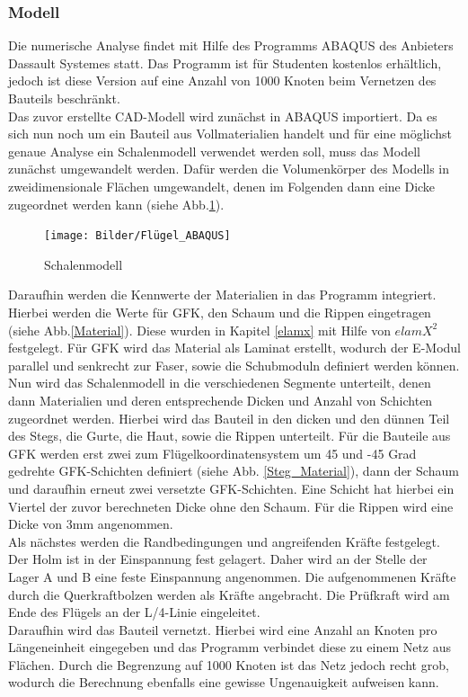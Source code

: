
\subsubsection{Modell}
Die numerische Analyse findet mit Hilfe des Programms ABAQUS des Anbieters Dassault Systemes statt. Das Programm ist für Studenten kostenlos erhältlich, jedoch ist diese Version auf eine Anzahl von 1000 Knoten beim Vernetzen des Bauteils beschränkt.\\
Das zuvor erstellte CAD-Modell wird zunächst in ABAQUS importiert. Da es sich nun noch um ein Bauteil aus Vollmaterialien handelt und für eine möglichst genaue Analyse ein Schalenmodell verwendet werden soll, muss das Modell zunächst umgewandelt werden. Dafür werden die Volumenkörper des Modells in zweidimensionale Flächen umgewandelt, denen im Folgenden dann eine Dicke zugeordnet werden kann (siehe Abb.\ref{Schalenmodell}).

\begin{figure}[h]
 \centering
 \texttt{[image: Bilder/Flügel\_ABAQUS]}
 \caption{Schalenmodell}
 \label{Schalenmodell}
\end{figure}
\noindent Daraufhin werden die Kennwerte der Materialien in das Programm integriert. Hierbei werden die Werte für GFK, den Schaum und die Rippen eingetragen (siehe Abb.\ref{Material}). Diese wurden in Kapitel \ref{elamx} mit Hilfe von $elamX^{2}$ festgelegt. Für GFK wird das Material als Laminat erstellt, wodurch der E-Modul parallel und senkrecht zur Faser, sowie die Schubmoduln definiert werden können.\\
\noindent Nun wird das Schalenmodell in die verschiedenen Segmente unterteilt, denen dann Materialien und deren entsprechende Dicken und Anzahl von Schichten zugeordnet werden. Hierbei wird das Bauteil in den dicken und den dünnen Teil des Stegs, die Gurte, die Haut, sowie die Rippen unterteilt. Für die Bauteile aus GFK werden erst zwei zum Flügelkoordinatensystem um 45 und -45 Grad gedrehte GFK-Schichten definiert (siehe Abb. \ref{Steg_Material}), dann der Schaum und daraufhin erneut zwei versetzte GFK-Schichten. Eine Schicht hat hierbei ein Viertel der zuvor berechneten Dicke ohne den Schaum. Für die Rippen wird eine Dicke von 3mm angenommen.\\
\noindent Als nächstes werden die Randbedingungen und angreifenden Kräfte festgelegt. Der Holm ist in der Einspannung fest gelagert. Daher wird an der Stelle der Lager A und B eine feste Einspannung angenommen. Die aufgenommenen Kräfte durch die Querkraftbolzen werden als Kräfte angebracht. Die Prüfkraft wird am Ende des Flügels an der L/4-Linie eingeleitet.\\
Daraufhin wird das Bauteil vernetzt. Hierbei wird eine Anzahl an Knoten pro Längeneinheit eingegeben und das Programm verbindet diese zu einem Netz aus Flächen. Durch die Begrenzung auf 1000 Knoten ist das Netz jedoch recht grob, wodurch die Berechnung ebenfalls eine gewisse Ungenauigkeit aufweisen kann. \\

